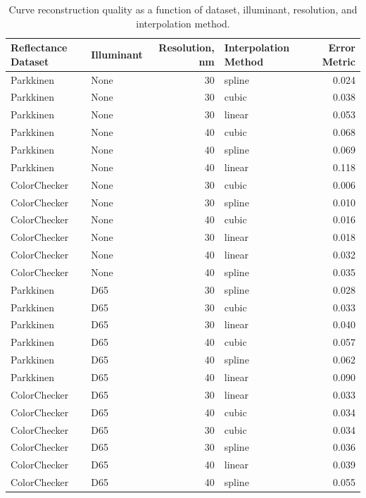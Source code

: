 \documentclass[twocolumn,10pt]{asme2ej}
\begin{document}
\begin{table}[t]
\begin{center}
\begin{tabular}{l l r l r}
\hline
\textbf{Reflectance Dataset} & \textbf{Illuminant} & \textbf{Resolution, nm} & \textbf{Interpolation Method} & \textbf{Error Metric} \\
\hline
Parkkinen & None & 30 & spline & 0.024  \\
Parkkinen & None & 30 & cubic  & 0.038  \\
Parkkinen & None & 30 & linear & 0.053  \\
Parkkinen & None & 40 & cubic  & 0.068  \\
Parkkinen & None & 40 & spline & 0.069  \\
Parkkinen & None & 40 & linear & 0.118  \\
\hline
ColorChecker & None & 30 & cubic  & 0.006  \\
ColorChecker & None & 30 & spline & 0.010  \\
ColorChecker & None & 40 & cubic  & 0.016  \\
ColorChecker & None & 30 & linear & 0.018  \\
ColorChecker & None & 40 & linear & 0.032  \\
ColorChecker & None & 40 & spline & 0.035  \\
\hline
Parkkinen & D65 & 30 & spline & 0.028  \\
Parkkinen & D65 & 30 & cubic  & 0.033  \\
Parkkinen & D65 & 30 & linear & 0.040  \\
Parkkinen & D65 & 40 & cubic  & 0.057  \\
Parkkinen & D65 & 40 & spline & 0.062  \\
Parkkinen & D65 & 40 & linear & 0.090  \\
\hline
ColorChecker & D65 & 30 & linear & 0.033  \\
ColorChecker & D65 & 40 & cubic  & 0.034  \\
ColorChecker & D65 & 30 & cubic  & 0.034  \\
ColorChecker & D65 & 30 & spline & 0.036  \\
ColorChecker & D65 & 40 & linear & 0.039  \\
ColorChecker & D65 & 40 & spline & 0.055  \\
\hline
\end{tabular}
\caption{Curve reconstruction quality as a function of dataset, illuminant, resolution, and interpolation method.}
\label{table_reconstruction}
\end{center}
\end{table}
\end{document}
